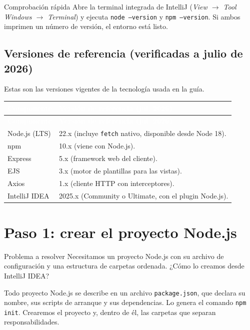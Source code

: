 \documentclass[11pt]{article}
\begin{document}
\begin{cajatip}{Comprobación rápida}
Abre la terminal integrada de IntelliJ (\emph{View $\rightarrow$ Tool Windows $\rightarrow$ Terminal}) y ejecuta \texttt{node --version} y \texttt{npm --version}. Si ambos imprimen un número de versión, el entorno está listo.\par
\end{cajatip}

\subsection{Versiones de referencia (verificadas a julio de 2026)}
Estas son las versiones vigentes de la tecnología usada en la guía.

{\renewcommand{\arraystretch}{1.25}
\begin{longtable}{>{\raggedright\arraybackslash}p{3.6cm} >{\raggedright\arraybackslash}p{11.8cm}}
\rowcolor{ndverde}\textcolor{white}{\textbf{Componente}} & \textcolor{white}{\textbf{Versión de referencia (jul. 2026)}} \\
\endfirsthead
\rowcolor{ndverde}\textcolor{white}{\textbf{Componente}} & \textcolor{white}{\textbf{Versión de referencia (jul. 2026)}} \\
\endhead
\ttfamily\color{ndverde}Node.js (LTS) & 22.x (incluye \texttt{fetch} nativo, disponible desde Node 18). \\ \hline
\ttfamily\color{ndverde}npm & 10.x (viene con Node.js). \\ \hline
\ttfamily\color{ndverde}Express & 5.x (framework web del cliente). \\ \hline
\ttfamily\color{ndverde}EJS & 3.x (motor de plantillas para las vistas). \\ \hline
\ttfamily\color{ndverde}Axios & 1.x (cliente HTTP con interceptores). \\ \hline
\ttfamily\color{ndverde}IntelliJ IDEA & 2025.x (Community o Ultimate, con el plugin Node.js). \\ \hline
\end{longtable}}

\section{Paso 1: crear el proyecto Node.js}
\begin{cajaproblema}{Problema a resolver}
Necesitamos un proyecto Node.js con su archivo de configuración y una estructura de carpetas ordenada. ¿Cómo lo creamos desde IntelliJ IDEA?\par
\end{cajaproblema}
Todo proyecto Node.js se describe en un archivo \texttt{package.\allowbreak{}json}, que declara su nombre, sus scripts de arranque y sus dependencias. Lo genera el comando \texttt{npm init}. Crearemos el proyecto y, dentro de él, las carpetas que separan responsabilidades.
\end{document}
